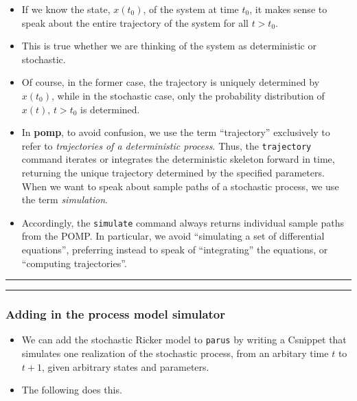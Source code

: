 \documentclass[]{article}
\begin{document}
\begin{itemize}
\item
  If we know the state, \(x(t_0)\), of the system at time \(t_0\), it
  makes sense to speak about the entire trajectory of the system for all
  \(t>t_0\).
\item
  This is true whether we are thinking of the system as deterministic or
  stochastic.
\item
  Of course, in the former case, the trajectory is uniquely determined
  by \(x(t_0)\), while in the stochastic case, only the probability
  distribution of \(x(t)\), \(t>t_0\) is determined.
\item
  In \textbf{pomp}, to avoid confusion, we use the term ``trajectory''
  exclusively to refer to \emph{trajectories of a deterministic
  process}. Thus, the \texttt{trajectory} command iterates or integrates
  the deterministic skeleton forward in time, returning the unique
  trajectory determined by the specified parameters. When we want to
  speak about sample paths of a stochastic process, we use the term
  \emph{simulation}.
\item
  Accordingly, the \texttt{simulate} command always returns individual
  sample paths from the POMP. In particular, we avoid ``simulating a set
  of differential equations'', preferring instead to speak of
  ``integrating'' the equations, or ``computing trajectories''.
\end{itemize}

\begin{center}\rule{0.5\linewidth}{\linethickness}\end{center}

\begin{center}\rule{0.5\linewidth}{\linethickness}\end{center}

\subsubsection{Adding in the process model
simulator}\label{adding-in-the-process-model-simulator}

\begin{itemize}
\item
  We can add the stochastic Ricker model to \texttt{parus} by writing a
  Csnippet that simulates one realization of the stochastic process,
  from an arbitary time \(t\) to \(t+1\), given arbitrary states and
  parameters.
\item
  The following does this.
\end{itemize}
\end{document}
